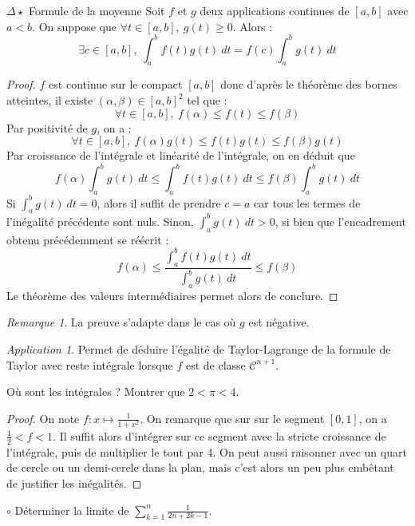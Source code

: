 \documentclass[french,a4paper]{article}
\theoremstyle{plain}
\theoremstyle{definition}
\theoremstyle{remark}
\newtheorem*{rmq}{Remarque}
\newtheorem*{app}{Application}
\begin{document}
\begin{ex}{$\Delta\star$ Formule de la moyenne}
	Soit $f$ et $g$ deux applications continues de $[a,b]$ avec $a<b$. On suppose que $\forall t\in[a,b],\ g(t)\geqslant0$. Alors : $$\exists c\in[a,b],\ \int_{a}^{b}f(t)g(t)\ dt=f(c)\int_{a}^{b}g(t)\ dt$$
\end{ex}
\begin{proof}
	$f$ est continue sur le compact $[a,b]$ donc d'après le théorème des bornes atteintes, il existe $(\alpha,\beta)\in[a,b]^2$ tel que : $$\forall t\in[a,b],\ f(\alpha)\leqslant f(t)\leqslant f(\beta)$$ Par positivité de $g$, on a : $$\forall t\in[a,b],\ f(\alpha)g(t)\leqslant f(t)g(t)\leqslant f(\beta)g(t)$$ Par croissance de l'intégrale et linéarité de l'intégrale, on en déduit que $$f(\alpha)\int_{a}^{b}g(t)\ dt \leqslant \int_{a}^{b}f(t)g(t)\ dt\leqslant f(\beta)\int_{a}^{b}g(t)\ dt$$ Si $\displaystyle \int_{a}^{b}g(t)\ dt=0$, alors il suffit de prendre $c=a$ car tous les termes de l'inégalité précédente sont nuls. Sinon, $\displaystyle \int_{a}^{b}g(t)\ dt >0$, si bien que l'encadrement obtenu précédemment se réécrit : $$f(\alpha)\leqslant\displaystyle\frac{\int_{a}^{b}f(t)g(t)\ dt}{\int_{a}^{b}g(t)\ dt}\leqslant f(\beta)$$ Le théorème des valeurs intermédiaires permet alors de conclure.
\end{proof}
\begin{rmq}
	La preuve s'adapte dans le cas où $g$ est négative.
\end{rmq}
\begin{app}
	Permet de déduire l'égalité de Taylor-Lagrange de la formule de Taylor avec reste intégrale lorsque $f$ est de classe $\mathcal{C}^{n+1}$.
\end{app}
\begin{ex}[Morlot]{Où sont les intégrales ?}
	Montrer que $2<\pi<4$.
\end{ex}
\begin{proof}
	On note $f:x \mapsto \frac{1}{1+x^2}$. On remarque que sur sur le segment $[0,1]$, on a $\frac{1}{2} < f <1$. Il suffit alors d'intégrer sur ce segment avec la stricte croissance de l'intégrale, puis de multiplier le tout par 4. On peut aussi raisonner avec un quart de cercle ou un demi-cercle dans la plan, mais c'est alors un peu plus embêtant de justifier les inégalités.
\end{proof}

\begin{ex}[Moulin.IG.03]{$\circ$}
	Déterminer la limite de $\displaystyle\sum_{k=1}^{n}\frac{1}{2n+2k-1}$.
\end{ex}
\end{document}
